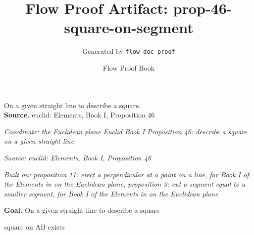 \documentclass[11pt]{article}
\title{Flow Proof Artifact: prop-46-square-on-segment}
\author{Generated by \texttt{flow doc proof}}
\date{Flow Proof Book}
\theoremstyle{definition}
\begin{document}
\maketitle
On a given straight line to describe a square.\\[0.5em]
\textbf{Source.} euclid: Elements, Book I, Proposition 46\\[0.5em]
\bigskip
{}\par
\smallskip\noindent\textit{Coordinate: the Euclidean plane \cdot Euclid Book I \cdot Proposition 46: describe a square on a given straight line}\par
\smallskip\noindent\textit{Source: euclid: Elements, Book I, Proposition 46}\par
\smallskip\noindent\textit{Built on: proposition 11: erect a perpendicular at a point on a line, for Book I of the Elements in on the Euclidean plane, proposition 3: cut a segment equal to a smaller segment, for Book I of the Elements in on the Euclidean plane}\par
\medskip
\noindent\textbf{Goal.} On a given straight line to describe a square\par
\noindent$\displaystyle \text{square on AB exists}$\par
\medskip
\noindent
\end{document}
